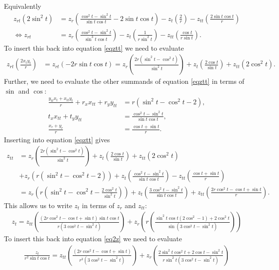 \documentclass{article}
\begin{document}
Equivalently
\begin{align*}
  z_{rt}(2\sin^2 t) &= z_r\left(\frac{\cos^2 t - \sin^2 t}{\sin t \cos t}-2\sin t\cos t\right)-z_t\left(\frac{2}{r}\right)
  -z_{tt}\left(\frac{2\sin t\cos t}{r}\right)\\
  \Leftrightarrow z_{rt}&=z_r\left(\frac{\cos^2 t - \sin^2 t}{\sin^3 t \cos t}\right)
  -z_t\left(\frac{1}{r\sin^2 t}\right)-z_{tt}\left(\frac{\cos t}{r\sin t}\right).
\end{align*}
To insert this back into equation \ref{eqztt} we need to evaluate
\begin{align*}
  z_{rt}\left(\frac{2x_t y_t}{r}\right)
  &=z_{rt}\left(-2r\sin t\cos t\right)
  =z_r\left(\frac{2r(\sin^2 t - \cos^2 t)}{\sin^2 t}\right)+z_t\left(\frac{2\cos t}{\sin t}\right)+z_{tt}\left(2\cos^2 t\right).
\end{align*}
Further, we need to evaluate the other summands of equation \ref{eqztt} in terms of $\sin$ and $\cos$:
\begin{align*}
  \frac{y_{tt}x_t+x_{tt}y_t}{r}+r_x x_{tt}+r_y y_{tt}&=r(\sin^2 t - \cos^2 t - 2),\\
  t_x x_{tt} + t_y y_{tt}&=\frac{\cos^2 t-\sin^2 t}{\sin t\cos t},\\
  \frac{x_r+y_r}{r}&=\frac{\cos t + \sin t}{r}.
\end{align*}
Inserting into equation \ref{eqztt} gives
\begin{align*}
  z_{tt} &= z_r\left(\frac{2r(\sin^2 t - \cos^2 t)}{\sin^2 t}\right)
  +z_t\left(\frac{2\cos t}{\sin t}\right)+z_{tt}\left(2\cos^2 t\right)\\
  &+z_r\left(r(\sin^2 t - \cos^2 t - 2)\right)+z_t\left(\frac{\cos^2 t-\sin^2 t}{\sin t\cos t}\right)-z_{tt}\left(\frac{\cos t + \sin t}{r}\right) \\
  &=z_r\left(r\left(\sin^2 t - \cos^2 t - \frac{2\cos^2 t}{\sin^2 t}\right)\right)
  +z_t\left(\frac{3\cos^2 t-\sin^2 t}{\sin t\cos t}\right)
  + z_{tt}\left(\frac{2r\cos^2 t - \cos t + \sin t}{r}\right).
\end{align*}
This allows us to write $z_t$ in terms of $z_r$ and $z_{tt}$:
\begin{align*}
  z_t = z_{tt}\left(\frac{(2r\cos^2 t - \cos t + \sin t)\sin t\cos t}{r(3\cos^2 t - \sin^2 t)}\right)
  + z_r \left(r\left(\frac{\sin^2 t\cos t(2\cos^2 -1)+2\cos^2 t}{\sin(3\cos^2 t - \sin^2 t)}\right)\right)
\end{align*}
To insert this back into equation \ref{eq2z} we need to evaluate
\begin{align*}
  \frac{z_t}{r^2\sin t\cos t}
  =z_{tt}\left(\frac{(2r\cos^2 t - \cos t + \sin t)}{r^3(3\cos^2 t - \sin^2 t)}\right)
  +z_{r}\left(\frac{2\sin^2 t\cos^2 t+2\cos t-\sin^2 t}{r\sin^2 t\left(3\cos^2 t - \sin^2 t\right)}\right)
\end{align*}
\end{document}
